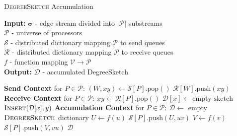 \documentclass{report}
\newcommand{\push}[1]{\text{push} \left ( #1 \right )}
\newcommand{\pop}{\text{pop}()}
\newcommand{\algoname}[1]{\textnormal{\textsc{#1}}}
\begin{document}
\begin{algorithm}[htbp] 
\caption{\algoname{DegreeSketch} Accumulation}\label{alg:ds:accumulation}
\begin{flushleft}
        \textbf{Input:} 		$\boldsymbol{\sigma}$ - edge stream divided into $|\mathcal{P}|$ substreams\\
        	\hspace{3.2em}	$\mathcal{P}$ - universe of processors	 \\
        	\hspace{3.2em}	$\mathcal{S}$ - distributed dictionary mapping $\mathcal{P}$ to send queues	 \\
        	\hspace{3.2em}	$\mathcal{R}$ - distributed dictionary mapping $\mathcal{P}$ to receive queues	 \\
        	\hspace{3.2em}	$f$ - function mapping $\mathcal{V} \rightarrow \mathcal{P}$	 \\
        \textbf{Output:} $\mathcal{D}$ - accumulated DegreeSketch
\end{flushleft}
\begin{flushleft}
\begin{algorithmic}[1]
	\Statex \textbf{Send Context} for $P \in \mathcal{P}$:
  			\State $(W, xy) \gets \mathcal{S}[P].\pop$
			\State $\mathcal{R}[W].\push{xy}$
  		\EndWhile
	\Statex \textbf{Receive Context} for $P \in \mathcal{P}$:
  			\State $xy \gets \mathcal{R}[P].\pop$
				\State $\mathcal{D}[x] \gets \text{empty sketch}$
			\EndIf
	  		\State $\algoname{Insert}(\mathcal{D}[x], y)$
  		\EndWhile
	\Statex \textbf{Accumulation Context} for $P \in \mathcal{P}$:
		\State $\mathcal{D} \gets $ empty $\algoname{DegreeSketch}$ dictionary
			\State $U \gets f(u)$
 			\State $\mathcal{S}[P].\push{U, uv}$
			\State $V \gets f(v)$
 			\State $\mathcal{S}[P].\push{V, vu}$
		\EndWhile
		\State \Return $\mathcal{D}$
\end{algorithmic}
\end{flushleft}
\end{algorithm}
\end{document}
